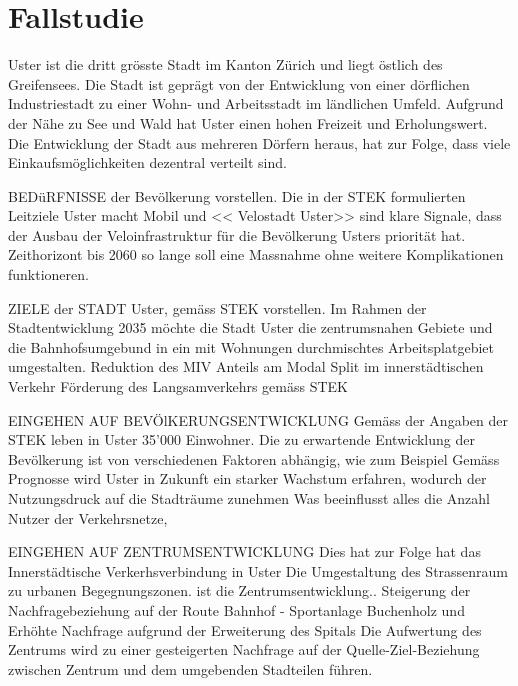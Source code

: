 %
%
%
%

\chapter{Fallstudie}
\label{chap:Fallstudie}

Uster ist die dritt grösste Stadt im Kanton Zürich und liegt östlich des Greifensees. Die Stadt ist geprägt von der Entwicklung von einer dörflichen Industriestadt zu einer Wohn- und Arbeitsstadt im ländlichen Umfeld. Aufgrund der Nähe zu See und Wald hat Uster einen hohen Freizeit und Erholungswert.
Die Entwicklung der Stadt aus mehreren Dörfern heraus, hat zur Folge, dass viele Einkaufsmöglichkeiten dezentral verteilt sind. 

BEDüRFNISSE der Bevölkerung vorstellen.
Die in der STEK formulierten Leitziele \guillemotleft Uster macht Mobil \guillemotright und << Velostadt Uster>> sind klare Signale, dass der Ausbau der Veloinfrastruktur für die Bevölkerung Usters priorität hat.
Zeithorizont bis 2060 so lange soll eine Massnahme ohne weitere Komplikationen funktioneren.

ZIELE der STADT Uster, gemäss STEK vorstellen.
Im Rahmen der Stadtentwicklung 2035 möchte die Stadt Uster die zentrumsnahen Gebiete und die Bahnhofsumgebund in ein mit Wohnungen durchmischtes Arbeitsplatgebiet umgestalten. 
Reduktion des MIV Anteils am Modal Split im innerstädtischen Verkehr
 Förderung des Langsamverkehrs gemäss STEK 

EINGEHEN AUF BEVÖlKERUNGSENTWICKLUNG
Gemäss der Angaben der STEK leben in Uster 35'000 Einwohner. Die zu erwartende Entwicklung der Bevölkerung ist von verschiedenen Faktoren abhängig, wie zum Beispiel 
Gemäss Prognosse wird Uster in Zukunft ein starker Wachstum erfahren, wodurch der Nutzungsdruck auf die Stadträume zunehmen
Was beeinflusst alles die Anzahl Nutzer der Verkehrsnetze,

EINGEHEN AUF ZENTRUMSENTWICKLUNG
Dies hat zur Folge hat das Innerstädtische Verkerhsverbindung in Uster 
Die Umgestaltung des Strassenraum zu urbanen Begegnungszonen. ist die Zentrumsentwicklung..
Steigerung der Nachfragebeziehung auf der Route Bahnhof - Sportanlage Buchenholz und
Erhöhte Nachfrage aufgrund der Erweiterung des Spitals
Die Aufwertung des Zentrums wird zu einer gesteigerten Nachfrage auf der Quelle-Ziel-Beziehung zwischen Zentrum und dem umgebenden Stadteilen führen.
 
